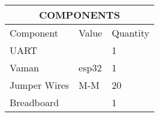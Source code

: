 \label{table:1}
\begin{tabular}{|p{5cm}|p{3cm}|p{2cm}|}
	\hline
	\multicolumn{3}{|c|}{COMPONENTS}\\
	\hline
	Component& Value& Quantity\\
	\hline
	UART &  & 1\\
	\hline
	Vaman& esp32& 1\\                        
	\hline                                    
	Jumper Wires& M-M& 20\\                  
	\hline                                    
	Breadboard&  & 1\\                         
	\hline                                     
\end{tabular}
